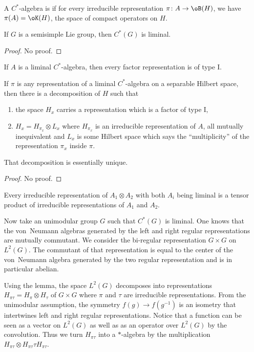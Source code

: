 A $C^*$-algebra is  if for every irreducible representation $\pi\colon A\to \oB(H)$, we have $\pi(A)=\oK(H)$, the space of compact operators on $H$.

\begin{theorem}
If $G$ is a semisimple Lie group, then $C^*(G)$ is liminal.
\end{theorem}
\begin{proof}
No proof.
\end{proof}

\begin{theorem}
If $A$ is a liminal $C^*$-algebra, then every factor representation is of type I.
\end{theorem}

\begin{theorem}
	If $\pi$ is any representation of a liminal $C^*$-algebra on a separable Hilbert space, then there is a decomposition of $H$ such that 
	\begin{enumerate}
		\item the space $H_x$ carries a representation which is a factor of type I,
		\item $H_x=H_{\pi_x}\otimes L_x$ where $H_{\pi_x}$ is an irreducible representation of $A$, all mutually inequivalent and $L_x$ is some Hilbert space which says the ``multiplicity'' of the representation $\pi_x$ inside $\pi$.
	\end{enumerate}
	That decomposition is essentially unique.
\end{theorem}

\begin{proof}
No proof.
\end{proof}

\begin{lemma}
Every irreducible representation of $A_1\otimes A_2$ with both $A_i$ being liminal is a tensor product of irreducible representations of $A_1$ and $A_2$.
\end{lemma}

Now take an unimodular group $G$ such that $C^*(G)$ is liminal. One knows that the von~Neumann algebras generated by the left and right regular representations are mutually commutant. We consider the bi-regular representation $G\times G$ on $L^2(G)$. The commutant of that representation is equal to the center of the von~Neumann algebra generated by the two regular representation and is in particular abelian.

Using the lemma, the space $ L^2(G)$ decomposes into representations $H_{\pi\tau}=H_{\pi}\otimes H_{\tau}$ of $G\times G$ where $\pi$ and $\tau$ are irreducible representations. From the unimodular assumption, the symmetry $f(g)\to f(g^{-1})$ is an isometry that intertwines left and right regular representations. Notice that a function can be seen as a vector on $L^2(G)$ as well as as an operator over $L^2(G)$ by the convolution. Thus we turn $H_{\pi\tau}$ into a $*$-algebra by the multiplication $H_{\pi\tau}\otimes H_{\pi\tau}\tau H_{\pi\tau}$.

